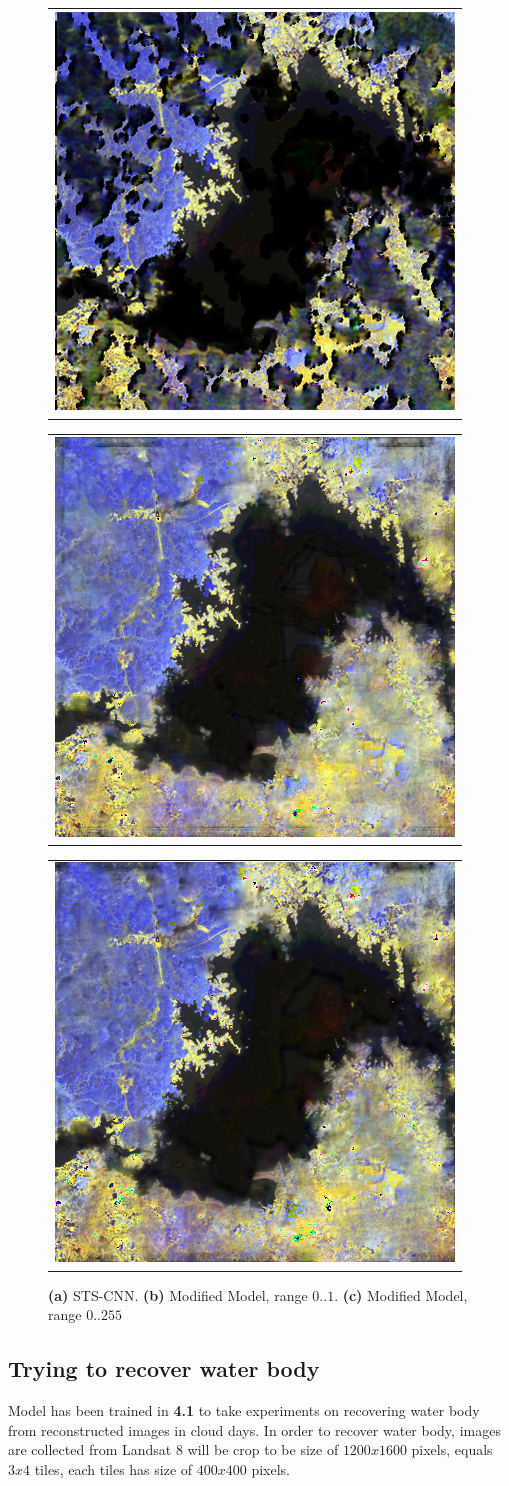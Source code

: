 \begin{figure}[h!]
    \begin{center}
        \begin{tabular}[b]{c}
            \includegraphics[width=0.3\linewidth]{figures/sts_real_cloud.png}
          \end{tabular}
          \begin{tabular}[b]{c}
            \includegraphics[width=0.3\linewidth]{figures/1_complex.png}
          \end{tabular}
          \begin{tabular}[b]{c}
              \includegraphics[width=0.3\linewidth]{figures/255_complex.png}
          \end{tabular} 
    \end{center}
    \caption{
		\textbf{(a)} STS-CNN.
		\textbf{(b)} Modified Model, range $0..1$.
		\textbf{(c)} Modified Model, range $0..255$}
	\label{fig:improvedModel_experiment_3}
\end{figure}


\subsection{Trying to recover water body}\label{experiment_timeSeriesModel}
Model has been trained in \textbf{4.1} to take experiments on recovering water body from reconstructed images in cloud days. In order to recover water body, images are collected from Landsat 8 will be crop to be size of $1200 x 1600$ pixels, equals $3 x 4$ tiles, each tiles has size of $400 x 400$ pixels.  

